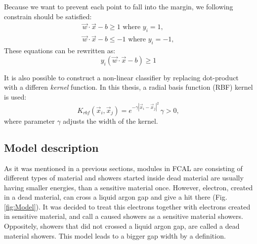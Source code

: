 Because we want to prevent each point to fall into the margin, we following constrain should be satisfied: 
\begin{eqnarray}
\vec{w}\cdot \vec{x} - b \geqslant 1 \textrm{ where } y_i = 1,\\
\vec{w}\cdot \vec{x} - b \leqslant -1 \textrm{ where } y_i = -1,
\end{eqnarray}
These equations can be rewritten as:
\begin{equation}
y_i(\vec{w}\cdot \vec{x} - b ) \geqslant 1
\end{equation}

It is also possible to construct a non-linear classifier by replacing dot-product with a differen \textit{kernel} function. In this thesis, a radial basis function (RBF) kernel is used:
\begin{equation}
K_{rbf}(\vec{x}_i, \vec{x}_j) = e^{-\gamma | \vec{x}_i - \vec{x}_j|^2} \, \gamma >0,
\end{equation}
where parameter $\gamma$ adjusts the width of the kernel.



\subsection{Model description}

\begin{figure}
\end{figure}


As it was mentioned in a previous sections, modules in FCAL are consisting of different types of material and showers started inside dead material are usually having smaller energies, than a sensitive material once. However, electron, created in a dead material, can cross a liquid argon gap and give a hit there (Fig. \ref{fig:Model}). It was decided to treat this electrons together with electrons created in sensitive material, and call a caused showers as a sensitive material showers. Oppositely, showers that did not crossed a liquid argon gap, are called a dead material showers. This model leads to a bigger gap width by a definition.


